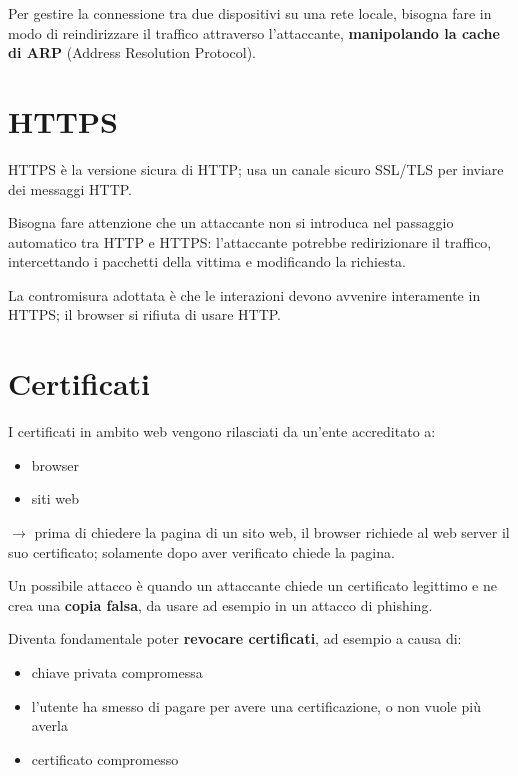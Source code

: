 Per gestire la connessione tra due dispositivi su una rete locale, bisogna 
fare in modo di reindirizzare il traffico attraverso l'attaccante, \textbf{manipolando 
la cache di ARP} (Address Resolution Protocol).

\section{HTTPS}
HTTPS è la versione sicura di HTTP; usa un canale sicuro SSL/TLS per inviare dei 
messaggi HTTP.

\noindent Bisogna fare attenzione che un attaccante non si introduca nel passaggio 
automatico tra HTTP e HTTPS: l'attaccante potrebbe redirizionare il traffico, 
intercettando i pacchetti della vittima e modificando la richiesta. 

\noindent La contromisura adottata è che le interazioni devono avvenire interamente 
in HTTPS; il browser si rifiuta di usare HTTP.

\section{Certificati}
I certificati in ambito web vengono rilasciati da un'ente accreditato a:
\begin{itemize}
    \item browser
    \item siti web
\end{itemize}

$\rightarrow$ prima di chiedere la pagina di un sito web, il browser richiede al web 
server il suo certificato; solamente dopo aver verificato chiede la pagina.

\noindent Un possibile attacco è quando un attaccante chiede un certificato legittimo
e ne crea una \textbf{copia falsa}, da usare ad esempio in un attacco di phishing.

\noindent Diventa fondamentale poter \textbf{revocare certificati}, ad esempio 
a causa di:
\begin{itemize}
    \item chiave privata compromessa 
    \item l'utente ha smesso di pagare per avere una certificazione, o non vuole più averla
    \item certificato compromesso
\end{itemize}

